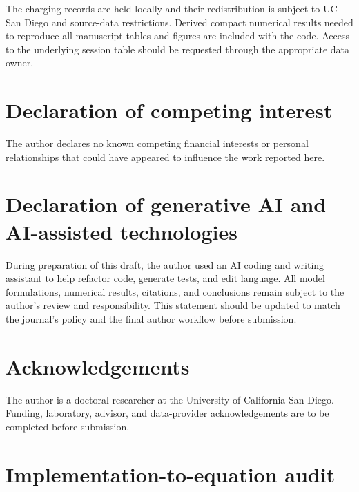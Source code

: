 \documentclass[11pt]{article}
\begin{document}
The charging records are held locally and their redistribution is subject to
UC San Diego and source-data restrictions.  Derived compact numerical results
needed to reproduce all manuscript tables and figures are included with the
code.  Access to the underlying session table should be requested through the
appropriate data owner.

\section*{Declaration of competing interest}

The author declares no known competing financial interests or personal
relationships that could have appeared to influence the work reported here.

\section*{Declaration of generative AI and AI-assisted technologies}

During preparation of this draft, the author used an AI coding and writing
assistant to help refactor code, generate tests, and edit language.  All model
formulations, numerical results, citations, and conclusions remain subject to
the author's review and responsibility.  This statement should be updated to
match the journal's policy and the final author workflow before submission.

\section*{Acknowledgements}

The author is a doctoral researcher at the University of California San Diego.
Funding, laboratory, advisor, and data-provider acknowledgements are to be
completed before submission.




\appendix
\section{Implementation-to-equation audit}
\end{document}
